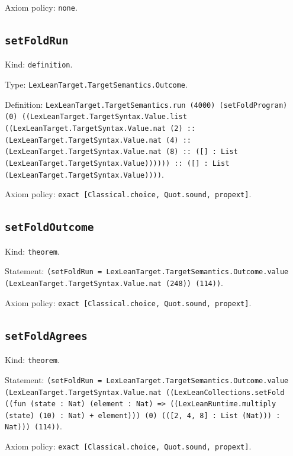 \documentclass[11pt]{article}
\begin{document}
\noindent Axiom policy: \texttt{none}.\par
\subsection*{\texttt{setFoldRun}}
\noindent Kind: \texttt{definition}.\par
\noindent Type: \texttt{LexLeanTarget.TargetSemantics.Outcome}.\par
\noindent Definition: \texttt{LexLeanTarget.TargetSemantics.run (4000) (setFoldProgram) (0) ((LexLeanTarget.TargetSyntax.Value.list ((LexLeanTarget.TargetSyntax.Value.nat (2) :: (LexLeanTarget.TargetSyntax.Value.nat (4) :: (LexLeanTarget.TargetSyntax.Value.nat (8) :: ([] : List (LexLeanTarget.TargetSyntax.Value)))))) :: ([] : List (LexLeanTarget.TargetSyntax.Value))))}.\par
\noindent Axiom policy: \texttt{exact [Classical.choice, Quot.sound, propext]}.\par
\subsection*{\texttt{setFoldOutcome}}
\noindent Kind: \texttt{theorem}.\par
\noindent Statement: \texttt{(setFoldRun = LexLeanTarget.TargetSemantics.Outcome.value (LexLeanTarget.TargetSyntax.Value.nat (248)) (114))}.\par
\noindent Axiom policy: \texttt{exact [Classical.choice, Quot.sound, propext]}.\par
\subsection*{\texttt{setFoldAgrees}}
\noindent Kind: \texttt{theorem}.\par
\noindent Statement: \texttt{(setFoldRun = LexLeanTarget.TargetSemantics.Outcome.value (LexLeanTarget.TargetSyntax.Value.nat ((LexLeanCollections.setFold ((fun (state : Nat) (element : Nat) => ((LexLeanRuntime.multiply (state) (10) : Nat) + element))) (0) (([2, 4, 8] : List (Nat))) : Nat))) (114))}.\par
\noindent Axiom policy: \texttt{exact [Classical.choice, Quot.sound, propext]}.\par
\end{document}

